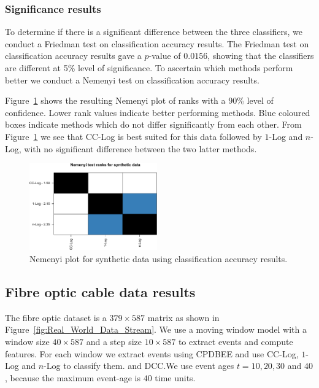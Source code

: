 \documentclass[a4paper,11pt]{article}
\newif\ifxyz
\let\ifxyz\iffalse
\begin{document}
\subsubsection{Significance results}
To determine if there is a  significant difference between the three classifiers, we conduct a Friedman test  on classification accuracy results. The Friedman test on classification accuracy results gave a $p$-value of $0.0156$,  showing that the classifiers are different at 5\% level of significance. To ascertain which methods perform better we conduct a Nemenyi test on classification accuracy results.

Figure~\ref{fig:NemenyiSynthetic} shows the  resulting Nemenyi plot of ranks with a 90\% level of confidence. Lower rank values indicate better performing methods. Blue coloured boxes indicate methods which do not differ significantly from each other. From Figure~\ref{fig:NemenyiSynthetic} we see that CC-Log is best suited for this data followed by $1$-Log and $n$-Log, with no significant difference between the two latter methods.

\begin{figure}[!ht]
	\centering
	\includegraphics[width=0.49\textwidth]{./Graphics/Nemenyi_Synthetic_Accuracy.pdf}
	\caption{Nemenyi plot for synthetic data using classification accuracy results.}
  \label{fig:NemenyiSynthetic}
\end{figure}

\subsection{Fibre optic cable data results}\label{sec:FibreOpticExperimentResults}

The fibre optic dataset is a $379 \times 587$ matrix as shown in Figure~\ref{fig:Real_World_Data_Stream}. We use a moving window model with a window size $40 \times 587$ and a step size $10 \times 587$ to extract events and compute features. For each window we extract  events using CPDBEE and use CC-Log, $1$-Log and $n$-Log to classify them. \ifxyz and DCC.\fi We use event ages $t = 10, 20, 30$ and $40$, because the maximum event-age is $40$ time units.
\end{document}
